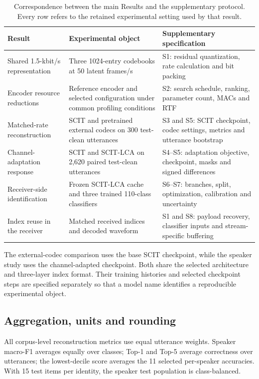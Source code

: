 \begin{table}[t]
\centering
\caption{Correspondence between the main Results and the supplementary protocol. Every row refers to the retained experimental setting used by that result.}
\label{tab:sv2-crosswalk}
\small
\begin{tabularx}{\textwidth}{@{}p{}p{}Y@{}}
\toprule
Result & Experimental object & Supplementary specification\\
\midrule
Shared 1.5-kbit/s representation & Three 1024-entry codebooks at 50 latent frames/s & S1: residual quantization, rate calculation and bit packing\\
Encoder resource reductions & Reference encoder and selected configuration under common profiling conditions & S2: search schedule, ranking, parameter count, MACs and RTF\\
Matched-rate reconstruction & SCIT and pretrained external codecs on 300 test-clean utterances & S3 and S5: SCIT checkpoint, codec settings, metrics and utterance bootstrap\\
Channel-adaptation response & SCIT and SCIT-LCA on 2,620 paired test-clean utterances & S4--S5: adaptation objective, checkpoint, masks and signed differences\\
Receiver-side identification & Frozen SCIT-LCA cache and three trained 110-class classifiers & S6--S7: branches, split, optimization, calibration and uncertainty\\
Index reuse in the receiver & Matched received indices and decoded waveform & S1 and S8: payload recovery, classifier inputs and stream-specific buffering\\
\bottomrule
\end{tabularx}
\end{table}

The external-codec comparison uses the base SCIT checkpoint, while the speaker study uses the channel-adapted checkpoint. Both share the selected architecture and three-layer index format. Their training histories and selected checkpoint steps are specified separately so that a model name identifies a reproducible experimental object.

\subsection{Aggregation, units and rounding}
All corpus-level reconstruction metrics use equal utterance weights. Speaker macro-F1 averages equally over classes; Top-1 and Top-5 average correctness over utterances; the lowest-decile score averages the 11 selected per-speaker accuracies. With 15 test items per identity, the speaker test population is class-balanced.

